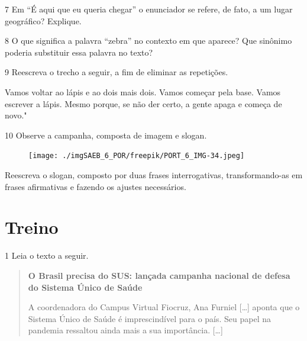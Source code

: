 \num{7} Em ``É aqui que eu queria chegar'' o enunciador se refere, de
fato, a um lugar geográfico? Explique.


\num{8} O que significa a palavra ``zebra'' no contexto em que aparece?
Que sinônimo poderia substituir essa palavra no texto?


\num{9} Reescreva o trecho a seguir, a fim de eliminar as repetições.

Vamos voltar ao lápis e ao dois mais dois. Vamos começar pela base.
Vamos escrever a lápis. Mesmo porque, se não der certo, a gente apaga e
começa de novo."


\num{10} Observe a campanha, composta de imagem e slogan.

\begin{figure}[H]
\centering\texttt{[image: ./imgSAEB\_6\_POR/freepik/PORT\_6\_IMG-34.jpeg]}
\end{figure}

\begin{quote}
\end{quote}

\noindent Reescreva o slogan, composto por duas frases interrogativas,
transformando-as em frases afirmativas e fazendo os ajustes necessários.


\section*{Treino}

\num{1} Leia o texto a seguir.

\begin{quote}
\textbf{O Brasil precisa do SUS: lançada campanha nacional de defesa do
Sistema Único de Saúde}\\
\medskip

\noindent A coordenadora do Campus Virtual Fiocruz, Ana Furniel {[}\ldots{]}
aponta que o Sistema Único de Saúde é imprescindível para o país. Seu
papel na pandemia ressaltou ainda mais a sua importância. {[}\ldots{]}

\end{quote}

